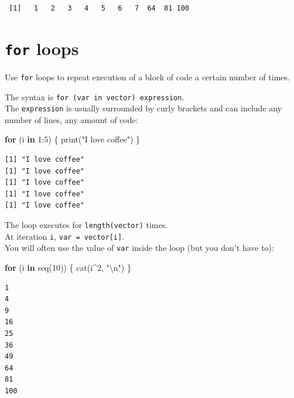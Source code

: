 \documentclass[
]{book}
\newenvironment{Shaded}{\begin{snugshade}}{\end{snugshade}}
\newcommand{\ControlFlowTok}[1]{\textcolor[rgb]{0.13,0.29,0.53}{\textbf{#1}}}
\newcommand{\DecValTok}[1]{\textcolor[rgb]{0.00,0.00,0.81}{#1}}
\newcommand{\FunctionTok}[1]{\textcolor[rgb]{0.00,0.00,0.00}{#1}}
\newcommand{\NormalTok}[1]{#1}
\newcommand{\SpecialCharTok}[1]{\textcolor[rgb]{0.00,0.00,0.00}{#1}}
\newcommand{\StringTok}[1]{\textcolor[rgb]{0.31,0.60,0.02}{#1}}
\begin{document}
\begin{verbatim}
 [1]   1   2   3   4   5   6   7  64  81 100
\end{verbatim}

\hypertarget{for-loops}{%
\section{\texorpdfstring{\texttt{for} loops}{for loops}}\label{for-loops}}

Use \texttt{for} loops to repeat execution of a block of code a certain number of times.

The syntax is \texttt{for\ (var\ in\ vector)\ expression}.\\
The \texttt{expression} is usually surrounded by curly brackets and can include any number of lines, any amount of code:

\begin{Shaded}
\begin{Highlighting}[]
\ControlFlowTok{for}\NormalTok{ (i }\ControlFlowTok{in} \DecValTok{1}\SpecialCharTok{:}\DecValTok{5}\NormalTok{) \{}
  \FunctionTok{print}\NormalTok{(}\StringTok{"I love coffee"}\NormalTok{)}
\NormalTok{\}}
\end{Highlighting}
\end{Shaded}

\begin{verbatim}
[1] "I love coffee"
[1] "I love coffee"
[1] "I love coffee"
[1] "I love coffee"
[1] "I love coffee"
\end{verbatim}

The loop executes for \texttt{length(vector)} times.\\
At iteration \texttt{i}, \texttt{var\ =\ vector{[}i{]}}.\\
You will often use the value of \texttt{var} inside the loop (but you don't have to):

\begin{Shaded}
\begin{Highlighting}[]
\ControlFlowTok{for}\NormalTok{ (i }\ControlFlowTok{in} \FunctionTok{seq}\NormalTok{(}\DecValTok{10}\NormalTok{)) \{}
  \FunctionTok{cat}\NormalTok{(i}\SpecialCharTok{\^{}}\DecValTok{2}\NormalTok{, }\StringTok{"}\SpecialCharTok{\textbackslash{}n}\StringTok{"}\NormalTok{)}
\NormalTok{\}}
\end{Highlighting}
\end{Shaded}

\begin{verbatim}
1 
4 
9 
16 
25 
36 
49 
64 
81 
100 
\end{verbatim}
\end{document}
